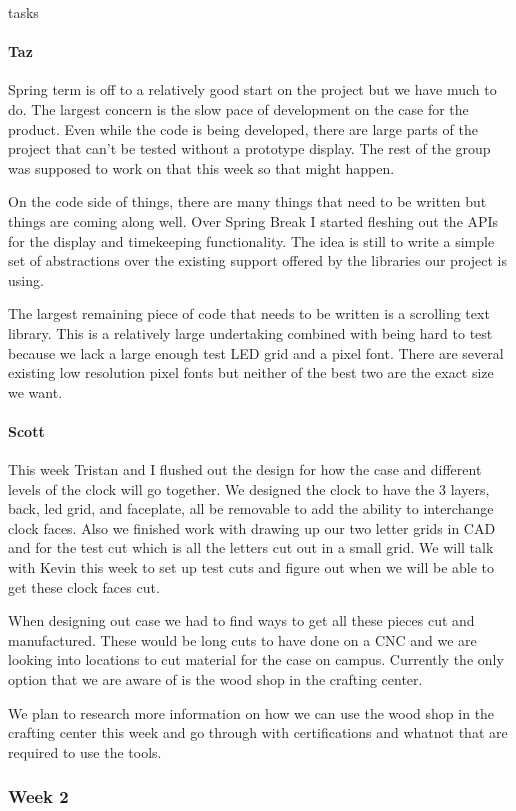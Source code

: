 tasks\documentclass[onecolumn, draftclsnofoot,10pt, compsoc]{IEEEtran}
\begin{document}
\paragraph{Taz}
Spring term is off to a relatively good start on the project but we have much to do. The largest concern is the slow pace of development on the case for the product. Even while the code is being developed, there are large parts of the project that can't be tested without a prototype display. The rest of the group was supposed to work on that this week so that might happen.

On the code side of things, there are many things that need to be written but things are coming along well. Over Spring Break I started fleshing out the APIs for the display and timekeeping functionality. The idea is still to write a simple set of abstractions over the existing support offered by the libraries our project is using.

The largest remaining piece of code that needs to be written is a scrolling text library. This is a relatively large undertaking combined with being hard to test because we lack a large enough test LED grid and a pixel font. There are several existing low resolution pixel fonts but neither of the best two are the exact size we want.
\paragraph{Scott}
This week Tristan and I flushed out the design for how the case and different levels of the clock will go together. We designed the clock to have the 3 layers, back, led grid, and faceplate, all be removable to add the ability to interchange clock faces. Also we finished work with drawing up our two letter grids in CAD and for the test cut which is all the letters cut out in a small grid. We will talk with Kevin this week to set up test cuts and figure out when we will be able to get these clock faces cut.

When designing out case we had to find ways to get all these pieces cut and manufactured. These would be long cuts to have done on a CNC and we are looking into locations to cut material for the case on campus. Currently the only option that we are aware of is the wood shop in the crafting center.

We plan to research more information on how we can use the wood shop in the crafting center this week and go through with certifications and whatnot that are required to use the tools.
\subsubsection{Week 2}
\end{document}
